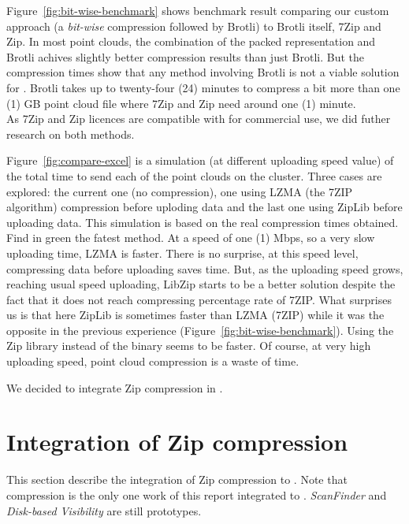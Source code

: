 Figure~\ref{fig:bit-wise-benchmark} shows benchmark result comparing our custom approach (a \emph{bit-wise} compression followed by Brotli) to Brotli itself, 7Zip and Zip. In most point clouds, the combination of the packed representation and Brotli achives slightly better compression results than just Brotli. But the compression times show that any method involving Brotli is not a viable solution for \CC. Brotli takes up to twenty-four (24) minutes to compress a bit more than one (1) GB point cloud file where 7Zip and Zip need around one (1) minute.\\
As 7Zip and Zip licences are compatible with \CC for commercial use, we did futher research on both methods.

Figure~\ref{fig:compare-excel} is a simulation (at different uploading speed value) of the total time to send each of the point clouds on the cluster. Three cases are explored: the current one (no compression), one using LZMA (the 7ZIP algorithm) compression before uploding data and the last one using ZipLib before uploading data. This simulation is based on the real compression times obtained. Find in green the fatest method. At a speed of one (1) Mbps, so a very slow uploading time, LZMA is faster. There is no surprise, at this speed level, compressing data before uploading saves time. But, as the uploading speed grows, reaching usual speed uploading, LibZip starts to be a better solution despite the fact that it does not reach compressing percentage rate of 7ZIP. What surprises us is that here ZipLib is sometimes faster than LZMA (7ZIP) while it was the opposite in the previous experience (Figure~\ref{fig:bit-wise-benchmark}). Using the Zip library instead of the binary seems to be faster. Of course, at very high uploading speed, point cloud compression is a waste of time.

We decided to integrate Zip compression in \CC.

\section{Integration of Zip compression}
\label{sc:integration}
This section describe the integration of Zip compression to \CC. Note that compression is the only one work of this report integrated to \CC. \emph{ScanFinder} and \emph{Disk-based Visibility} are still prototypes.

